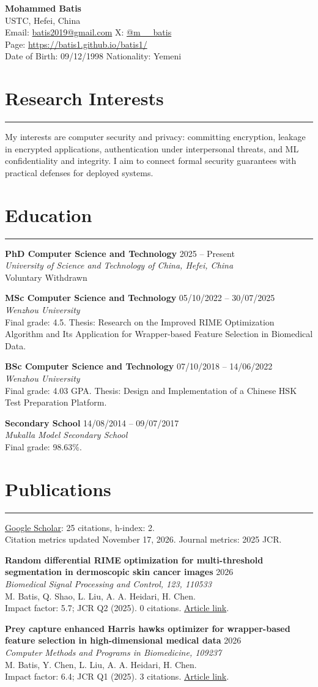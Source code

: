 \documentclass[11pt,a4paper]{article}
\newcommand{\cvsection}[1]{
  \section*{#1}
  \vspace{-0.6em}
  \hrule
  \vspace{0.6em}
}
\newcommand{\cventry}[4]{
  \begin{minipage}{\linewidth}
  \textbf{#1} \hfill #2 \\
  \emph{#3} \\
  #4
  \end{minipage}
  \par
  \vspace{0.45em}
}
\begin{document}
{\LARGE \textbf{Mohammed Batis}}\\[0.35em]
USTC, Hefei, China \\
Email: \href{mailto:batis2019@gmail.com}{batis2019@gmail.com} \quad
X: \href{https://x.com/m__batis}{@m\_\_batis} \\
Page: \href{https://batis1.github.io/batis1/}{https://batis1.github.io/batis1/} \\
Date of Birth: 09/12/1998 \quad Nationality: Yemeni

\cvsection{Research Interests}
My interests are computer security and privacy: committing encryption, leakage in encrypted applications, authentication under interpersonal threats, and ML confidentiality and integrity. I aim to connect formal security guarantees with practical defenses for deployed systems.

\cvsection{Education}
\cventry
  {PhD Computer Science and Technology}
  {2025 -- Present}
  {University of Science and Technology of China, Hefei, China}
  {Voluntary Withdrawn}

\cventry
  {MSc Computer Science and Technology}
  {05/10/2022 -- 30/07/2025}
  {Wenzhou University}
  {Final grade: 4.5. Thesis: Research on the Improved RIME Optimization Algorithm and Its Application for Wrapper-based Feature Selection in Biomedical Data.}

\cventry
  {BSc Computer Science and Technology}
  {07/10/2018 -- 14/06/2022}
  {Wenzhou University}
  {Final grade: 4.03 GPA. Thesis: Design and Implementation of a Chinese HSK Test Preparation Platform.}

\cventry
  {Secondary School}
  {14/08/2014 -- 09/07/2017}
  {Mukalla Model Secondary School}
  {Final grade: 98.63\%.}

\cvsection{Publications}
\href{https://scholar.google.com/citations?user=7lz2lbUAAAAJ\&hl=en}{Google Scholar}: 25 citations, h-index: 2.\\
{\small Citation metrics updated November 17, 2026. Journal metrics: 2025 JCR.}

\cventry
  {Random differential RIME optimization for multi-threshold segmentation in dermoscopic skin cancer images}
  {2026}
  {Biomedical Signal Processing and Control, 123, 110533}
  {M. Batis, Q. Shao, L. Liu, A. A. Heidari, H. Chen.\\
  Impact factor: 5.7; JCR Q2 (2025). 0 citations. \href{https://www.sciencedirect.com/science/article/pii/S1746809426010876}{Article link}.}

\cventry
  {Prey capture enhanced Harris hawks optimizer for wrapper-based feature selection in high-dimensional medical data}
  {2026}
  {Computer Methods and Programs in Biomedicine, 109237}
  {M. Batis, Y. Chen, L. Liu, A. A. Heidari, H. Chen.\\
  Impact factor: 6.4; JCR Q1 (2025). 3 citations. \href{https://www.sciencedirect.com/science/article/pii/S0169260726000052}{Article link}.}
\end{document}
